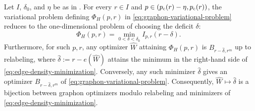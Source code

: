 \begin{corollary}\label{cor:one-dimensional-reduction}
Let $I$, $\delta_0$, and $\eta$ be as in .
For every $r\in I$ and $p\in(p_{\mathrm c}(r)-\eta,p_{\mathrm c}(r))$, the variational problem
defining $\Phi_H(p,r)$ in \eqref{eq:graphon-variational-problem} reduces to the
one-dimensional problem of choosing the deficit $\delta$:
\begin{equation}\label{eq:edge-density-minimization}
  \Phi_H(p,r)=
  \min_{0<\delta<\delta_0}I_{p,r}(r-\delta).
\end{equation}
Furthermore, for such $p,r$, any optimizer $\widehat W$ attaining $\Phi_H(p,r)$
is $B_{r-\widehat\delta,r^m}$ up to relabeling, where $\widehat\delta:=r-e(\widehat W)$
attains the minimum in the right-hand side of \eqref{eq:edge-density-minimization}.
Conversely, any such minimizer $\widehat\delta$ gives an optimizer $B_{r-\widehat\delta,r^m}$ of
\eqref{eq:graphon-variational-problem}.  Consequently, $\widehat W\mapsto\widehat\delta$ is
a bijection between graphon optimizers modulo relabeling and minimizers of
\eqref{eq:edge-density-minimization}.
\end{corollary}

